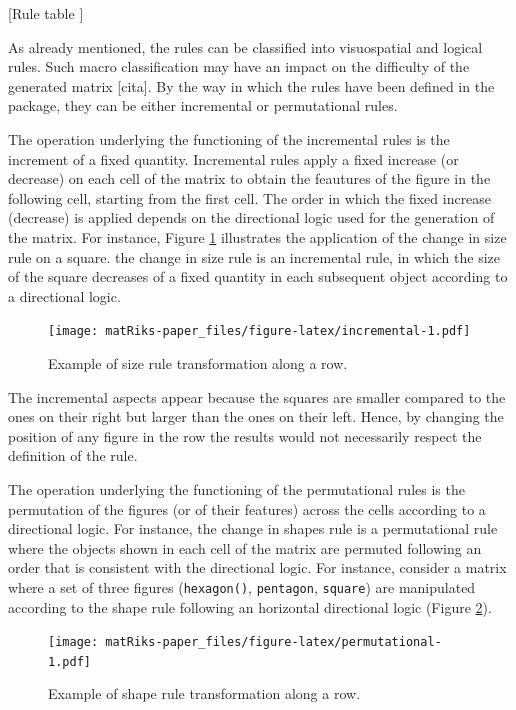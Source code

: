 {[}Rule table {]}

As already mentioned, the rules can be classified into visuospatial and logical rules.
Such macro classification may have an impact on the difficulty of the generated matrix {[}cita{]}.
By the way in which the rules have been defined in the  package, they can be either incremental or permutational rules.

The operation underlying the functioning of the incremental rules is the increment of a fixed quantity.
Incremental rules apply a fixed increase (or decrease) on each cell of the matrix to obtain the feautures of the figure in the following cell, starting from the first cell.
The order in which the fixed increase (decrease) is applied depends on the directional logic used for the generation of the matrix.
For instance, Figure \ref{fig:incremental} illustrates the application of the change in size rule on a square. the change in size rule is an incremental rule, in which the size of the square decreases of a fixed quantity in each subsequent object according to a directional logic.

\begin{figure}
\centering
\texttt{[image: matRiks-paper\_files/figure-latex/incremental-1.pdf]}
\caption{\label{fig:incremental}Example of size rule transformation along a row.}
\end{figure}

The incremental aspects appear because the squares are smaller compared to the ones on their right but larger than the ones on their left.
Hence, by changing the position of any figure in the row the results would not necessarily respect the definition of the rule.

The operation underlying the functioning of the permutational rules is the permutation of the figures (or of their features) across the cells according to a directional logic.
For instance, the change in shapes rule is a permutational rule where the objects shown in each cell of the matrix are permuted following an order that is consistent with the directional logic.
For instance, consider a matrix where a set of three figures (\texttt{hexagon()}, \texttt{pentagon}, \texttt{square}) are manipulated according to the shape rule following an horizontal directional logic (Figure \ref{fig:permutational}).

\begin{figure}
\centering
\texttt{[image: matRiks-paper\_files/figure-latex/permutational-1.pdf]}
\caption{\label{fig:permutational}Example of shape rule transformation along a row.}
\end{figure}


